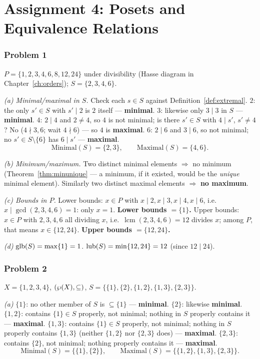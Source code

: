 \chapter{Assignment 4: Posets and Equivalence Relations}\label{ch:sol4}

\subsection*{Problem 1}
$P=\{1,2,3,4,6,8,12,24\}$ under divisibility (Hasse diagram in Chapter~\ref{ch:orders}); $S=\{2,3,4,6\}$.

\emph{(a) Minimal/maximal in $S$.} Check each $s\in S$ against Definition~\ref{def:extremal}. $2$: the only $s'\in S$ with $s'\mid2$ is $2$ itself — \textbf{minimal}. $3$: likewise only $3\mid3$ in $S$ — \textbf{minimal}. $4$: $2\mid4$ and $2\ne4$, so $4$ is not minimal; is there $s'\in S$ with $4\mid s'$, $s'\ne4$? No ($4\nmid3,6$; wait $4\nmid6$) — so $4$ is \textbf{maximal}. $6$: $2\mid6$ and $3\mid6$, so not minimal; no $s'\in S\setminus\{6\}$ has $6\mid s'$ — \textbf{maximal}.
\[
\text{Minimal}(S)=\{2,3\},\qquad\text{Maximal}(S)=\{4,6\}.
\]

\emph{(b) Minimum/maximum.} Two distinct minimal elements $\Rightarrow$ no minimum (Theorem~\ref{thm:minunique} — a minimum, if it existed, would be the \emph{unique} minimal element). Similarly two distinct maximal elements $\Rightarrow$ \textbf{no maximum}.

\emph{(c) Bounds in $P$.} Lower bounds: $x\in P$ with $x\mid2,x\mid3,x\mid4,x\mid6$, i.e.\ $x\mid\gcd(2,3,4,6)=1$: only $x=1$. \textbf{Lower bounds $=\{1\}$.} Upper bounds: $x\in P$ with $2,3,4,6$ all dividing $x$, i.e.\ $\operatorname{lcm}(2,3,4,6)=12$ divides $x$; among $P$, that means $x\in\{12,24\}$. \textbf{Upper bounds $=\{12,24\}$.}

\emph{(d)} $\operatorname{glb}(S)=\max\{1\}=1$. $\operatorname{lub}(S)=\min\{12,24\}=12$ (since $12\mid24$).

\subsection*{Problem 2}
$X=\{1,2,3,4\}$, $(\wp(X),\subseteq)$, $S=\{\{1\},\{2\},\{1,2\},\{1,3\},\{2,3\}\}$.

\emph{(a)} $\{1\}$: no other member of $S$ is $\subseteq\{1\}$ — \textbf{minimal}. $\{2\}$: likewise \textbf{minimal}. $\{1,2\}$: contains $\{1\}\in S$ properly, not minimal; nothing in $S$ properly contains it — \textbf{maximal}. $\{1,3\}$: contains $\{1\}\in S$ properly, not minimal; nothing in $S$ properly contains $\{1,3\}$ (neither $\{1,2\}$ nor $\{2,3\}$ does) — \textbf{maximal}. $\{2,3\}$: contains $\{2\}$, not minimal; nothing properly contains it — \textbf{maximal}.
\[
\text{Minimal}(S)=\{\{1\},\{2\}\},\qquad\text{Maximal}(S)=\{\{1,2\},\{1,3\},\{2,3\}\}.
\]

